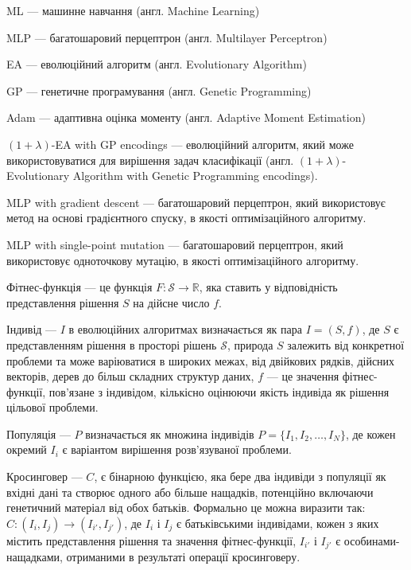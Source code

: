 ML --- машинне навчання (англ. Machine Learning)

MLP --- багатошаровий перцептрон (англ. Multilayer Perceptron)

EA --- еволюційний алгоритм (англ. Evolutionary Algorithm)

GP --- генетичне програмування (англ. Genetic Programming)

Adam --- адаптивна оцінка моменту (англ. Adaptive Moment Estimation)

$(1+\lambda)$-EA with GP encodings --- еволюційний алгоритм, який може використовуватися для вирішення задач класифікації (англ. $(1+\lambda)$-Evolutionary Algorithm with Genetic Programming encodings).

MLP with gradient descent --- багатошаровий перцептрон, який використовує метод на основі градієнтного спуску, в якості оптимізаційного алгоритму.

MLP with single-point mutation --- багатошаровий перцептрон, який використовує одноточкову мутацію, в якості оптимізаційного алгоритму.

Фітнес-функція --- це функція \( F: \mathcal{S} \rightarrow \mathbb{R} \), яка ставить у відповідність представлення рішення \( S \) на дійсне число \( f \).

Індивід --- \( I \) в еволюційних алгоритмах визначається як пара \( I = (S, f) \), де \( S \) є представленням рішення в просторі рішень \( \mathcal{S} \), природа \( S \) залежить від конкретної проблеми та може варіюватися в широких межах, від двійкових рядків, дійсних векторів, дерев до більш складних структур даних, \( f \) — це значення фітнес-функції, пов’язане з індивідом, кількісно оцінюючи якість індивіда як рішення цільової проблеми.

Популяція --- \( P \) визначається як множина індивідів \( P = \{I_1, I_2, \ldots, I_N\} \), де кожен окремий \( I_i \) є варіантом вирішення розв'язуваної проблеми.

Кросинговер --- \( C \), є бінарною функцією, яка бере два індивіди з популяції як вхідні дані та створює одного або більше нащадків, потенційно включаючи генетичний матеріал від обох батьків. Формально це можна виразити так: \( C: (I_i, I_j) \rightarrow (I_{i'}, I_{j'}) \), де \( I_i \) і \( I_j \) є батьківськими індивідами, кожен з яких містить представлення рішення та значення фітнес-функції, \( I_{i'} \) і \( I_{j'} \) є особинами-нащадками, отриманими в результаті операції кросинговеру.

